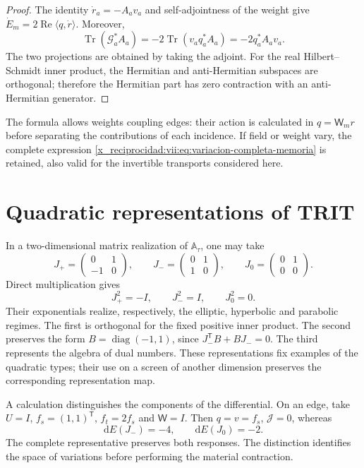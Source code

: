 \begin{proof}
The identity \(\dot r_a=-A_av_a\) and self-adjointness of the weight give
\(\dot E_m=2\operatorname{Re}\langle q,\dot r\rangle\).
Moreover,
\[
 \operatorname{Tr}(\mathcal G_a^*A_a)
 =-2\operatorname{Tr}(v_aq_a^*A_a)=-2q_a^*A_av_a.
\]
The two projections are obtained by taking the adjoint. For the real
Hilbert--Schmidt inner product, the Hermitian and anti-Hermitian subspaces are
orthogonal; therefore the Hermitian part has zero contraction with
an anti-Hermitian generator.
\end{proof}

The formula allows weights coupling edges: their action is calculated in
\(q=\mathsf W_mr\) before separating the contributions of each
incidence. If field or weight vary, the complete expression
\eqref{x_reciprocidad:vii:eq:variacion-completa-memoria} is retained, also valid for the
invertible transports considered here.

\section{Quadratic representations of TRIT}

In a two-dimensional matrix realization of
\(\mathbb A_\tau\), one may take
\[
 J_{+}=\begin{pmatrix}0&1\\-1&0\end{pmatrix},\qquad
 J_{-}=\begin{pmatrix}0&1\\1&0\end{pmatrix},\qquad
 J_{0}=\begin{pmatrix}0&1\\0&0\end{pmatrix}.
\]
Direct multiplication gives
\[
 J_+^2=-I,\qquad J_-^2=I,\qquad J_0^2=0.
\]
Their exponentials realize, respectively, the elliptic,
hyperbolic and parabolic regimes. The first is orthogonal for the fixed
positive inner product. The second preserves the form
\(B=\operatorname{diag}(-1,1)\), since
\(J_-^{\mathsf T}B+BJ_-=0\). The third represents the algebra
of dual numbers. These representations fix examples of the quadratic
types; their use on a screen of another dimension preserves the
corresponding representation map.

A calculation distinguishes the components of the differential. On an edge,
take \(U=I\), \(f_s=(1,1)^{\mathsf T}\),
\(f_t=2f_s\) and \(\mathsf W=I\). Then \(q=v=f_s\),
\(\mathcal J=0\), whereas
\begin{equation}
 \mathrm dE(J_-)=-4,\qquad \mathrm dE(J_0)=-2.
 \label{x_reciprocidad:vii:eq:control-regimenes-corriente}
\end{equation}
The complete representative preserves both responses. The distinction
identifies the space of variations before performing the material
contraction.

